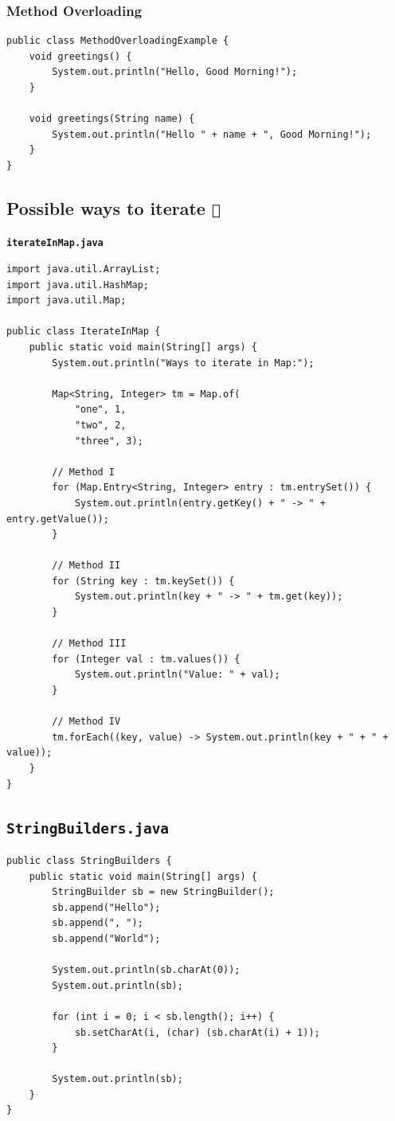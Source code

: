 \documentclass{book}
\begin{document}
\subsubsection{Method Overloading}

\begin{verbatim}
public class MethodOverloadingExample {
    void greetings() {
        System.out.println("Hello, Good Morning!");
    }

    void greetings(String name) {
        System.out.println("Hello " + name + ", Good Morning!");
    }
}
\end{verbatim}



\subsection{Possible ways to iterate \texttt{🏃}}

\textbf{\texttt{iterateInMap.java}}

\begin{verbatim}
import java.util.ArrayList;
import java.util.HashMap;
import java.util.Map;

public class IterateInMap {
    public static void main(String[] args) {
        System.out.println("Ways to iterate in Map:");

        Map<String, Integer> tm = Map.of(
            "one", 1,
            "two", 2,
            "three", 3);

        // Method I
        for (Map.Entry<String, Integer> entry : tm.entrySet()) {
            System.out.println(entry.getKey() + " -> " + entry.getValue());
        }

        // Method II
        for (String key : tm.keySet()) {
            System.out.println(key + " -> " + tm.get(key));
        }

        // Method III
        for (Integer val : tm.values()) {
            System.out.println("Value: " + val);
        }

        // Method IV
        tm.forEach((key, value) -> System.out.println(key + " + " + value));
    }
}
\end{verbatim}

\subsection{\texttt{StringBuilders.java}}

\begin{verbatim}
public class StringBuilders {
    public static void main(String[] args) {
        StringBuilder sb = new StringBuilder();
        sb.append("Hello");
        sb.append(", ");
        sb.append("World");

        System.out.println(sb.charAt(0));
        System.out.println(sb);

        for (int i = 0; i < sb.length(); i++) {
            sb.setCharAt(i, (char) (sb.charAt(i) + 1));
        }

        System.out.println(sb);
    }
}
\end{verbatim}
\end{document}
